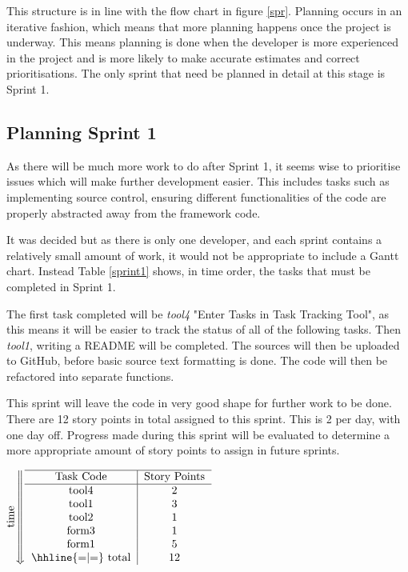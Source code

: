 \documentclass[a4paper,12pt]{article}
\begin{document}
This structure is in line with the flow chart in figure \ref{spr}. Planning occurs in an iterative fashion, which means that more planning happens once the project is underway. This means planning is done when the developer is more experienced in the project and is more likely to make accurate estimates and correct prioritisations. The only sprint that need be planned in detail at this stage is Sprint 1.

\subsection{Planning Sprint 1}
As there will be much more work to do after Sprint 1, it seems wise to prioritise issues which will make further development easier. This includes tasks such as implementing source control, ensuring different functionalities of the code are properly abstracted away from the framework code.

It was decided but as there is only one developer, and each sprint contains a relatively small amount of work, it would not be appropriate to include a Gantt chart. Instead Table \ref{sprint1} shows, in time order, the tasks that must be completed in Sprint 1.

The first task completed will be \textit{tool4} "Enter Tasks in Task Tracking Tool", as this means it will be easier to track the status of all of the following tasks. Then \textit{tool1}, writing a README will be completed. The sources will then be uploaded to GitHub, before basic source text formatting is done. The code will then be refactored into separate functions.

This sprint will leave the code in very good shape for further work to be done. There are 12 story points in total assigned to this sprint. This is 2 per day, with one day off. Progress made during this sprint will be evaluated to determine a more appropriate amount of story points to assign in future sprints.

\begin{table} 
\centering
$\rotatebox[origin=c]{90}{time}%
\left\Downarrow
\begin{tabular}{ c | c } \hline
Task Code & Story Points \\ \hline
tool4 & 2 \\
tool1 & 3 \\ 
tool2 & 1 \\
form3 & 1 \\ 
form1 & 5 \\ \hhline{=|=}
total & 12 \\

\end{tabular}
\right.
$
\caption{Table showing sprint 1 order of work.}
\label{sprint1}
\end{table}
\end{document}
